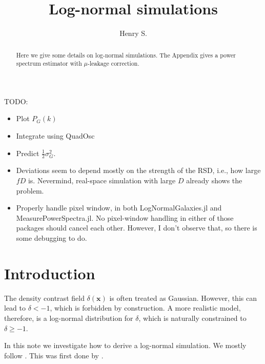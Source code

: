 \documentclass[aps,prd,reprint,floatfix,superscriptaddress,showkeys,nofootinbib]{revtex4-1}
\def\vx{{\bm{x}}}
\begin{document}
\title{Log-normal simulations}

\author{Henry S. }


\begin{abstract}
  Here we give some details on log-normal simulations. The Appendix gives a
  power spectrum estimator with $\mu$-leakage correction.
\end{abstract}



\maketitle
\tableofcontents


TODO:
\begin{itemize}
  \item Plot $P_G(k)$
  \item Integrate using QuadOsc
  \item Predict $\frac12\sigma_G^2$.
  \item Deviations seem to depend mostly on the strength of the RSD, i.e., how
    large $fD$ is. Nevermind, real-space simulation with large $D$ already
    shows the problem.
  \item Properly handle pixel window, in both LogNormalGalaxies.jl and
    MeasurePowerSpectra.jl. No pixel-window handling in either of those
    packages should cancel each other. However, I don't observe that, so there
    is some debugging to do.
\end{itemize}



\section{Introduction}
The density contrast field $\delta(\vx)$ is often treated as Gaussian. However,
this can lead to $\delta<-1$, which is forbidden by construction. A more
realistic model, therefore, is a log-normal distribution for $\delta$, which is
naturally constrained to $\delta\geq-1$.

In this note we investigate how to derive a log-normal simulation. We
mostly follow \citet{Agrawal+:2017JCAP...10..003A}. This was first done by
\citet{Coles+:1991MNRAS.248....1C}.
\end{document}
